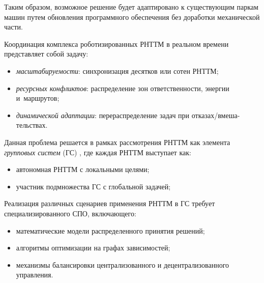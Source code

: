 Таким образом, возможное решение будет адаптировано к существующим паркам машин путем обновления программного обеспечения без доработки механической части.

Координация комплекса роботизированных РНТТМ в реальном времени представляет собой задачу:
\begin{itemize}[beginpenalty=10000, midpenalty=10000, wide=\parindent, leftmargin=0pt]
	\item \textit{масштабируемости}: синхронизация десятков или сотен РНТТМ;

	\item \textit{ресурсных конфликтов}: распределение зон ответственности, энергии и~маршрутов;

	\item \textit{динамической адаптации}: перераспределение задач при отказах/вмеша-тельствах.
\end{itemize}

Данная проблема решается в рамках рассмотрения РНТТМ как элемента \textit{групповых систем} (ГС) \cite{vakbib1}, где каждая РНТТМ выступает как:
\begin{itemize}[beginpenalty=10000, midpenalty=10000, wide=\parindent, leftmargin=0pt]
	\item автономная РНТТМ с локальными целями;

	\item участник подмножества ГС с глобальной задачей;
\end{itemize}


Реализация различных сценариев применения РНТТМ в ГС требует специализированного СПО, включающего:
\begin{itemize}[beginpenalty=10000, midpenalty=10000, wide=\parindent, leftmargin=0pt]
	\item математические модели распределенного принятия решений;

	\item алгоритмы оптимизации на графах зависимостей;

	\item механизмы балансировки централизованного и децентрализованного управления.
\end{itemize}
